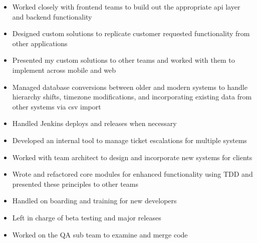 \documentclass[10pt,a4paper,ragged2e]{altacv}
\begin{document}
\divider

\begin{itemize}
\item Worked closely with frontend teams to build out the appropriate api layer and backend functionality
\item Designed custom solutions to replicate customer requested functionality from other applications
\item Presented my custom solutions to other teams and worked with them to implement across mobile
and web
\item Managed database conversions between older and modern systems to handle hierarchy shifts,
timezone modifications, and incorporating existing data from other systems via csv import
\item Handled Jenkins deploys and releases when necessary
\end{itemize}

\divider

\begin{itemize}
\item Developed an internal tool to manage ticket escalations for multiple systems
\item Worked with team architect to design and incorporate new systems for clients
\item Wrote and refactored core modules for enhanced functionality using TDD and presented these principles to other teams
\item Handled on boarding and training for new developers
\item Left in charge of beta testing and major releases
\item Worked on the QA sub team to examine and merge code
\end{itemize}

\divider
\end{document}
